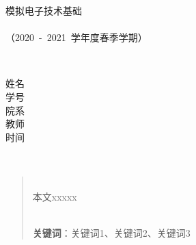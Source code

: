 \documentclass[UTF8]{ctexart}  %
\begin{document}

\begin{titlepage} %
    \heiti
    \vspace*{100pt}
    \begin{center}
        \fontsize{30pt}{0} 模\quad 拟\quad 电\quad 子\quad 技\quad 术\quad 基\quad 础\quad \\
        \vspace*{36pt}
        \\
        \vspace*{48pt}
        \LARGE（2020\ -\ 2021\ 学年度\qquad 春季学期）\\
        \vspace*{48pt}

        \fontsize{20pt}{0} \ \underline{}\\
        \vspace*{72pt}

        \heiti\Large 姓名\ \ \underline{}\\
        \heiti\Large 学号\ \ \underline{}\\
        \heiti\Large 院系\ \ \underline{}\\
        \heiti\Large 教师\ \ \underline{}\\
        \heiti\Large 时间\ \ \underline{}\\
    \end{center}
\end{titlepage}

\newpage

\renewcommand{\abstractname}{\textbf{\Large \heiti 摘要}}

~\\

\begin{abstract}

    ~\\

    \large{    本文xxxxx}

    
    ~\\

    \textbf{关键词}：关键词1、关键词2、关键词3
\end{abstract}


\newpage

\tableofcontents %
\thispagestyle{empty}
\end{document}
